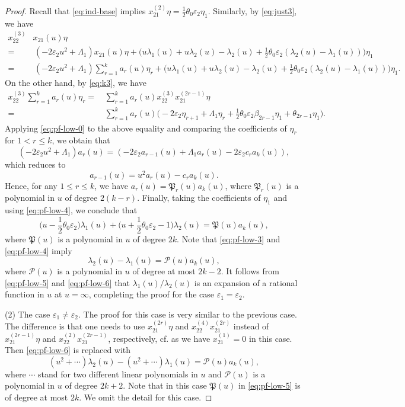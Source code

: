 \documentclass[11pt,reqno]{amsart}
\numberwithin{equation}{section}
\theoremstyle{definition}
\theoremstyle{remark}
\newcommand{\beq}{\begin{equation}}
\newcommand{\eeq}{\end{equation}}
\newcommand{\lle}{\leqslant}
\newcommand{\la}{\lambda}
\newcommand{\La}{\Lambda}
\newcommand{\ve}{\varepsilon}
\begin{document}
\begin{proof}
Recall that \eqref{eq:ind-base} implies $x_{21}^{(2)}\eta=\frac{1}{2}\theta_0\ve_2\eta_1$. Similarly, by \eqref{eq:just3}, we have
\begin{align*}
    x_{22}^{(3)}&x_{21}(u)\eta\\
    =&\,(-2\ve_2u^2+\La_1)x_{21}(u)\eta+\Big(u\la_1(u)+u\la_2(u)-\la_2(u)+\frac{1}{2}\theta_0\ve_2(\la_2(u)-\la_1(u))\Big)\eta_1\\
    =&\,(-2\ve_2u^2+\La_1)\sum_{r=1}^k a_r(u)\eta_r+\Big(u\la_1(u)+u\la_2(u)-\la_2(u)+\frac{1}{2}\theta_0\ve_2(\la_2(u)-\la_1(u))\Big)\eta_1.
\end{align*}
On the other hand, by \eqref{eq:k3}, we have
\begin{align*}
    x_{22}^{(3)}\sum_{r=1}^k a_r(u)\eta_r=&\,\sum_{r=1}^k a_r(u)x_{22}^{(3)}x_{21}^{(2r-1)}\eta\\
    =&\, \sum_{r=1}^k a_r(u)\Big(-2\ve_2\eta_{r+1}+\La_1\eta_r+\frac{1}{2}\theta_0\ve_2\beta_{2r-1}\eta_1+\theta_{2r-1}\eta_1\Big).
\end{align*}
Applying \eqref{eq:pf-low-0} to the above equality and comparing the coefficients of $\eta_r$ for $1<r\lle k$, we obtain that
\[
(-2\ve_2u^2+\La_1)a_r(u)=(-2\ve_2a_{r-1}(u)+\La_1 a_r(u)-2\ve_2 c_ra_k(u)),
\]
which reduces to
\beq\label{eq:pf-low-4}
a_{r-1}(u)=u^2a_r(u)-c_ra_k(u).
\eeq
Hence, for any $1\lle r\lle k$, we have $a_r(u)=\mathfrak P_r(u)a_k(u)$, where $\mathfrak P_r(u)$ is a polynomial in $u$ of degree $2(k-r)$. Finally, taking the coefficients of $\eta_1$ and using \eqref{eq:pf-low-4}, we conclude that
\beq\label{eq:pf-low-5}
\Big(u-\frac{1}{2}\theta_0\ve_2\Big)\la_1(u)+\Big(u+\frac{1}{2}\theta_0\ve_2-1\Big)\la_2(u)=\mathfrak P(u)a_k(u),
\eeq
where $\mathfrak P(u)$ is a polynomial in $u$ of degree $2k$. Note that \eqref{eq:pf-low-3} and \eqref{eq:pf-low-4} imply
\beq\label{eq:pf-low-6}
\la_2(u)-\la_1(u)=\mathscr P(u) a_k(u),
\eeq
where $\mathscr P(u)$ is a polynomial in $u$ of degree at most $2k-2$. It follows from \eqref{eq:pf-low-5} and \eqref{eq:pf-low-6} that $\la_1(u)/\la_2(u)$ is an expansion of a rational function in $u$ at $u=\infty$, completing the proof for the case $\ve_1=\ve_2$.

(2) The case $\ve_1\ne\ve_2$. The proof for this case is very similar to the previous case. The difference is that one needs to use $x_{21}^{(2r)}\eta$ and $x_{22}^{(4)}x_{21}^{(2r)}$ instead of $x_{21}^{(2r-1)}\eta$ and $x_{22}^{(2)}x_{21}^{(2r-1)}$, respectively, cf. \cite[Proposition 6.1]{Molev1998finite} as we have $x_{21}^{(1)}=0$ in this case. Then \eqref{eq:pf-low-6} is replaced with
\[
(u^2+\cdots)\la_2(u)-(u^2+\cdots)\la_1(u)=\mathscr P(u)a_k(u),
\]
where $\cdots$ stand for two different linear polynomials  in $u$ and $\mathscr P(u)$ is a polynomial in $u$ of degree $2k+2$. Note that in this case $\mathfrak P(u)$ in \eqref{eq:pf-low-5} is of degree at most $2k$.
We omit the detail for this case.
\end{proof}
\end{document}
